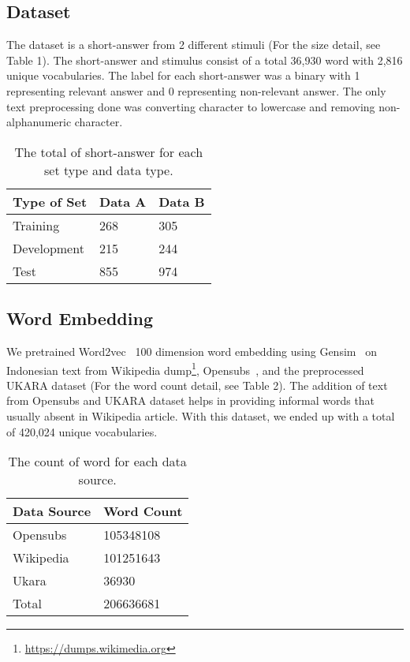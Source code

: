 \documentclass[11pt,a4paper]{article}
\begin{document}
\subsection{Dataset}

The dataset is a short-answer from 2 different stimuli (For the size detail, see Table 1). The short-answer and stimulus consist of a total 36,930 word with 2,816 unique vocabularies. The label for each short-answer was a binary with 1 representing relevant answer and 0 representing non-relevant answer. The only text preprocessing done was converting character to lowercase and removing non-alphanumeric character.

\begin{table}
\centering
\small
\begin{tabular}{|l|l|l|}
\hline
\textbf{Type of Set} & \textbf{Data A} & \textbf{Data B}\\\hline
{Training} & {268} & {305} \\
{Development} & {215} & {244}  \\ 
{Test} & {855} & {974}  \\\hline
\end{tabular} 
\caption{The total of short-answer for each set type and data type.}
\end{table}

\subsection{Word Embedding}

We pretrained Word2vec~\cite{Word2vec} 100 dimension word embedding using Gensim~\cite{rehurek_lrec} on Indonesian text from Wikipedia dump\footnote{\url{https://dumps.wikimedia.org}}, Opensubs~\cite{opensubs}, and the preprocessed UKARA dataset (For the word count detail, see Table 2). The addition of text from Opensubs and UKARA dataset helps in providing informal words that usually absent in Wikipedia article. With this dataset, we ended up with a total of 420,024 unique vocabularies.

\begin{table}
\centering
\small
\begin{tabular}{|l|l|}
\hline
\textbf{Data Source} & \textbf{Word Count}\\\hline
{Opensubs} & {105348108}\\ 
{Wikipedia} & {101251643}\\
{Ukara} & {36930}\\ 
{Total} & {206636681}\\\hline
\end{tabular} 
\caption{The count of word for each data source.}
\end{table}
\end{document}
